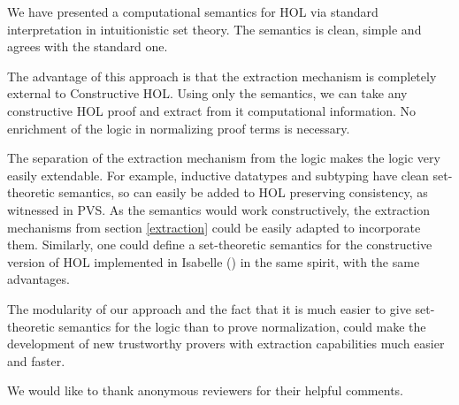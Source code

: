 \documentclass{LMCS}
\begin{document}
We have presented a computational semantics for HOL via standard
interpretation in intuitionistic set theory. The semantics is clean, simple and 
agrees with the standard one. 

The advantage of this approach is that the extraction mechanism is
completely external to Constructive HOL. Using only the semantics, we can take 
any constructive HOL proof and extract from it computational information. 
No enrichment of the logic in normalizing proof terms is necessary. 

The separation of the extraction mechanism from the logic makes the logic
very easily extendable. For example, inductive datatypes and subtyping 
have clean set-theoretic semantics, so can easily be added to HOL preserving consistency, as witnessed in PVS. As the semantics
would work constructively, the extraction mechanisms from section \ref{extraction} could be easily adapted to incorporate
them. Similarly, one could define a set-theoretic semantics for the constructive version of 
HOL implemented in Isabelle (\cite{Ber04,BN02}) in the same spirit, with the
same advantages. 

The modularity of our approach and the fact that it is much easier to give
set-theoretic semantics for the logic than to prove normalization, could make 
the development of new trustworthy provers with extraction capabilities much
easier and faster.

We would like to thank anonymous reviewers for their helpful comments. 



\end{document}
